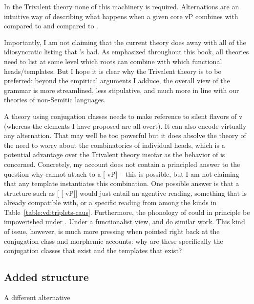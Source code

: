 \begin{exe}
\begin{xlist}
\begin{xlist}
\begin{exe}
\begin{exe}
\begin{xlist}
\begin{exe}
\begin{xlist}
\begin{exe}
\begin{xlist}
\begin{xlist}
\begin{exe}
\begin{xlist}
\begin{exe}
\begin{xlist}
\begin{exe}
\begin{exe}
\begin{exe}
\begin{xlist}
\begin{exe}
\begin{exe}
\begin{xlist}
\begin{xlist}
\begin{exe}
\begin{xlist}
\begin{exe}
\begin{exe}
\begin{exe}
\begin{xlist}
\begin{exe}
\begin{exe}
\begin{xlist}
\begin{exe}
\begin{xlist}
\begin{exe}
\begin{xlist}
\begin{exe}
\begin{xlist}
\begin{exe}
\begin{exe}
\begin{xlist}
\begin{exe}
\begin{exe}
\begin{xlist}
\begin{xlist}
\begin{exe}
\begin{xlist}
\begin{xlist}
\begin{exe}
\begin{xlist}
\begin{exe}
\begin{xlist}
\begin{exe}
\begin{xlist}
\begin{exe}
\begin{xlist}
\begin{exe}
\begin{exe}
\begin{exe}
\begin{exe}
\begin{xlist}
\begin{exe}
\begin{exe}
\begin{xlist}
\begin{xlist}
\begin{exe}
\begin{exe}
\begin{xlist}
\begin{exe}
\begin{xlist}
In the Trivalent theory none of this machinery is required. Alternations are an intuitive way of describing what happens when a given core vP combines with  compared to {\vz} and compared to {\vd}.

Importantly, I am not claiming that the current theory does away with all of the idiosyncratic listing that \citeauthor{arad05}'s had. As emphasized throughout this book, all theories need to list at some level which roots can combine with which functional heads/templates. But I hope it is clear why the Trivalent theory is to be preferred: beyond the empirical arguments I adduce, the overall view of the grammar is more streamlined, less stipulative, and much more in line with our theories of non-Semitic languages.

A theory using conjugation classes needs to make reference to silent flavors of v (whereas the elements I have proposed are all overt). It can also encode virtually any alternation. That may well be too powerful but it does absolve the theory of the need to worry about the combinatorics of individual heads, which is a potential advantage over the Trivalent theory insofar as the behavior of {\vd} is concerned. Concretely, my account does not contain a principled answer to the question why {\vd} cannot attach to a [{\va} vP] -- this is possible, but I am not claiming that any template instantiates this combination. One possible answer is that a structure such as [{\vd} [{\va} vP]] would just entail an agentive reading, something that {\vd} is already compatible with, or a specific  reading from among the kinds in Table~\ref{table:vd:triplets-caus}. Furthermore, the phonology of {\va} could in principle be impoverished under {\vd}. Under a functionalist view, {\va} and {\vd} do similar work. This kind of issue, however, is much more pressing when pointed right back at the conjugation class and morphemic accounts: why are these specifically the conjugation classes that exist and the templates that exist?

	\subsection{Added structure} \label{vd:others:struct}
A different alternative 
\end{xlist}
\end{exe}
\end{xlist}
\end{exe}
\end{exe}
\end{xlist}
\end{xlist}
\end{exe}
\end{exe}
\end{xlist}
\end{exe}
\end{exe}
\end{exe}
\end{exe}
\end{xlist}
\end{exe}
\end{xlist}
\end{exe}
\end{xlist}
\end{exe}
\end{xlist}
\end{exe}
\end{xlist}
\end{xlist}
\end{exe}
\end{xlist}
\end{xlist}
\end{exe}
\end{exe}
\end{xlist}
\end{exe}
\end{exe}
\end{xlist}
\end{exe}
\end{xlist}
\end{exe}
\end{xlist}
\end{exe}
\end{xlist}
\end{exe}
\end{exe}
\end{xlist}
\end{exe}
\end{exe}
\end{exe}
\end{xlist}
\end{exe}
\end{xlist}
\end{xlist}
\end{exe}
\end{exe}
\end{xlist}
\end{exe}
\end{exe}
\end{exe}
\end{xlist}
\end{exe}
\end{xlist}
\end{exe}
\end{xlist}
\end{xlist}
\end{exe}
\end{xlist}
\end{exe}
\end{xlist}
\end{exe}
\end{exe}
\end{xlist}
\end{xlist}
\end{exe}
